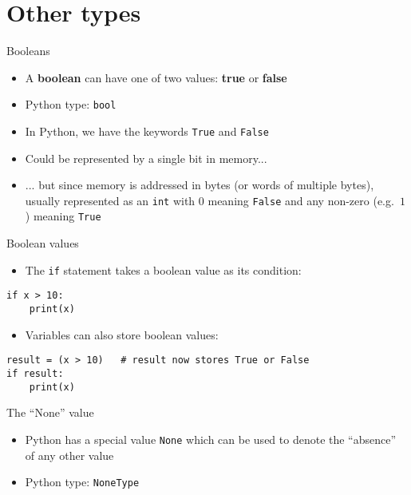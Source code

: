\part{Other types}
\frame{\partpage}

\begin{frame}{Booleans}
	\begin{itemize}
		\pause\item A \textbf{boolean} can have one of two values: \textbf{true} or \textbf{false}
		\pause\item Python type: \lstinline{bool}
		\pause\item In Python, we have the keywords \lstinline{True} and \lstinline{False}
		\pause\item Could be represented by a single bit in memory...
		\pause\item ... but since memory is addressed in bytes (or words of multiple bytes),
			usually represented as an \lstinline{int} with $0$ meaning \lstinline{False}
			and any non-zero (e.g.\ $1$) meaning \lstinline{True}
	\end{itemize}
\end{frame}

\begin{frame}[fragile]{Boolean values}
	\begin{itemize}
		\pause\item The \lstinline{if} statement takes a boolean value as its condition:
	\end{itemize}
	\begin{lstlisting}
if x > 10:
    print(x)
	\end{lstlisting}
	\begin{itemize}
		\pause\item Variables can also store boolean values:
	\end{itemize}
	\begin{lstlisting}
result = (x > 10)   # result now stores True or False
if result:
    print(x)
	\end{lstlisting}
\end{frame}

\begin{frame}{The ``None'' value}
	\begin{itemize}
		\pause\item Python has a special value \lstinline{None} which can be used to denote the ``absence'' of any other value
		\pause\item Python type: \lstinline{NoneType}
	\end{itemize}
\end{frame}

